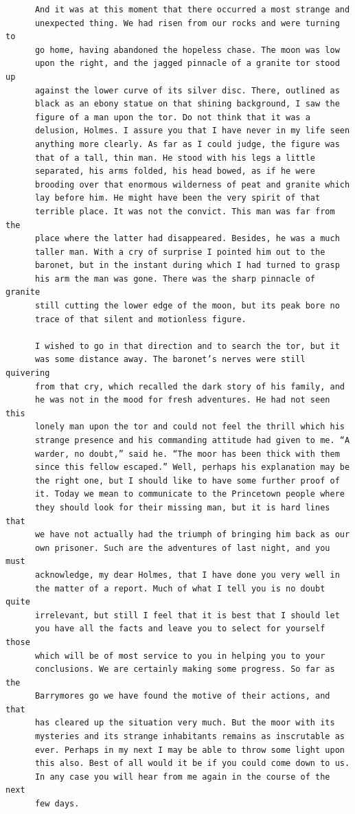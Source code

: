 \documentclass{article}
\begin{document}
\begin{verbatim}
      And it was at this moment that there occurred a most strange and
      unexpected thing. We had risen from our rocks and were turning to
      go home, having abandoned the hopeless chase. The moon was low
      upon the right, and the jagged pinnacle of a granite tor stood up
      against the lower curve of its silver disc. There, outlined as
      black as an ebony statue on that shining background, I saw the
      figure of a man upon the tor. Do not think that it was a
      delusion, Holmes. I assure you that I have never in my life seen
      anything more clearly. As far as I could judge, the figure was
      that of a tall, thin man. He stood with his legs a little
      separated, his arms folded, his head bowed, as if he were
      brooding over that enormous wilderness of peat and granite which
      lay before him. He might have been the very spirit of that
      terrible place. It was not the convict. This man was far from the
      place where the latter had disappeared. Besides, he was a much
      taller man. With a cry of surprise I pointed him out to the
      baronet, but in the instant during which I had turned to grasp
      his arm the man was gone. There was the sharp pinnacle of granite
      still cutting the lower edge of the moon, but its peak bore no
      trace of that silent and motionless figure.

      I wished to go in that direction and to search the tor, but it
      was some distance away. The baronet’s nerves were still quivering
      from that cry, which recalled the dark story of his family, and
      he was not in the mood for fresh adventures. He had not seen this
      lonely man upon the tor and could not feel the thrill which his
      strange presence and his commanding attitude had given to me. “A
      warder, no doubt,” said he. “The moor has been thick with them
      since this fellow escaped.” Well, perhaps his explanation may be
      the right one, but I should like to have some further proof of
      it. Today we mean to communicate to the Princetown people where
      they should look for their missing man, but it is hard lines that
      we have not actually had the triumph of bringing him back as our
      own prisoner. Such are the adventures of last night, and you must
      acknowledge, my dear Holmes, that I have done you very well in
      the matter of a report. Much of what I tell you is no doubt quite
      irrelevant, but still I feel that it is best that I should let
      you have all the facts and leave you to select for yourself those
      which will be of most service to you in helping you to your
      conclusions. We are certainly making some progress. So far as the
      Barrymores go we have found the motive of their actions, and that
      has cleared up the situation very much. But the moor with its
      mysteries and its strange inhabitants remains as inscrutable as
      ever. Perhaps in my next I may be able to throw some light upon
      this also. Best of all would it be if you could come down to us.
      In any case you will hear from me again in the course of the next
      few days.





\end{verbatim}
\end{document}
